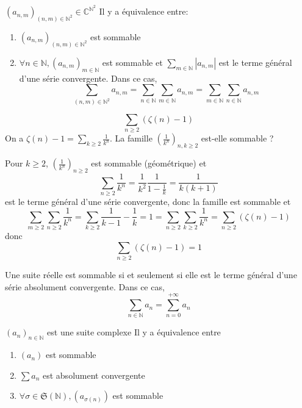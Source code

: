 \begin{cor}
    \Hyp $(a_{n, m})_{(n, m)\in\mathbb N^2}\in\mathbb C^{\mathbb N^2}$
    \Conc Il y a équivalence entre: \begin{enumerate}[left=1.2cm,label=\alph{enumi}.]
        \item $(a_{n,m})_{(n,m)\in\mathbb N^2}$ est sommable
        \item $\forall n\in\mathbb N, (a_{n, m})_{m\in\mathbb N}$ est sommable et $\sum_{m\in\mathbb N}|a_{n,m}|$ est le terme général d'une série convergente. Dans ce cas, \[
                \sum_{(n, m)\in\mathbb N^2}a_{n, m}=\sum_{n\in\mathbb N}\sum_{m\in\mathbb N}a_{n,m}=\sum_{m\in\mathbb N}\sum_{n\in\mathbb N}a_{n, m}
            \]
    \end{enumerate}
\end{cor}

\begin{ex}
    \[
        \sum_{n\geq 2}(\zeta(n)-1)
    \]
    On a $\zeta(n)-1=\sum_{k\geq 2}\frac1{k^n}$. La famille $\displaystyle \left( \frac1{k^n} \right)_{n, k\geq 2}$ est-elle sommable ?

    Pour $k\geq 2$, $\left(\frac1{k^n}\right)_{n\geq 2}$ est sommable (géométrique) et \[
        \sum_{n\geq 2}\frac1{k^n}=\frac1{k^2}\frac1{1-\frac1k}=\frac1{k(k+1)}
    \] est le terme général d'une série convergente, donc la famille est sommable et \[
    \sum_{m\geq 2}\sum_{n\geq 2}\frac1{k^n}=\sum_{k\geq 2}\frac1{k-1}-\frac1k=1=\sum_{n\geq 2}\sum_{k\geq 2}\frac1{k^n}=\sum_{n\geq 2}(\zeta(n)-1)
\]
donc \[
    \sum_{n\geq 2}(\zeta(n)-1)=1
\]
\end{ex}

\begin{rem}
    Une suite réelle est sommable si et seulement si elle est le terme général d'une série absolument convergente. Dans ce cas, \[
        \sum_{n\in\mathbb N}a_n=\sum_{n=0}^{+\infty}a_n
    \]
\end{rem}

\begin{prop}
    \Hyp $(a_n)_{n\in\mathbb N}$ est une suite complexe
    \Conc Il y a équivalence entre \begin{enumerate}[left=1.2cm,label=\alph{enumi}.]
        \item $(a_n)$ est sommable
        \item $\sum a_n$ est absolument convergente
        \item $\forall \sigma\in\mathfrak S(\mathbb N), (a_{\sigma(n)})$ est sommable
    \end{enumerate}
\end{prop}

